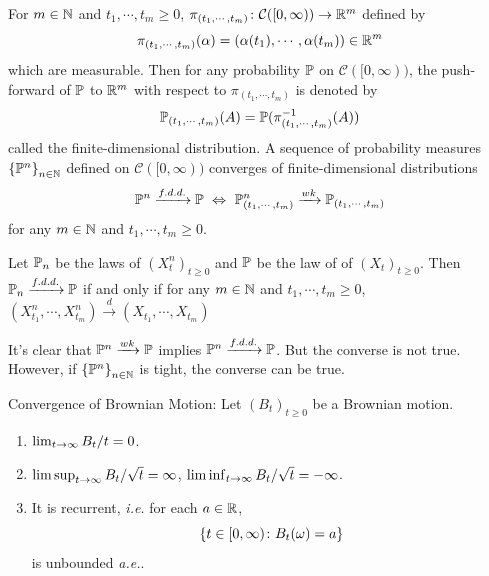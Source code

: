 \documentclass[a4paper,12pt]{article}
\begin{document}
\begin{itemize}
  \noindent For $m \in \mathbb{N}$ and $t_1,\cdots,t_m \geqslant 0$, $\pi_{(t_1,\cdots,t_m)} \colon \mathcal{C}([0,\infty)) \rightarrow \mathbb{R}^m$ defined by
  \begin{equation*}
    \pi_{(t_1,\cdots,t_m)}(\alpha) = (\alpha(t_1),\cdots,\alpha(t_m)) \in \mathbb{R}^m
  \end{equation*}
  which are measurable. Then for any probability $\mathbb{P}$ on $\mathcal{C}([0,\infty))$, the push-forward of $\mathbb{P}$ to $\mathbb{R}^m$ with respect to $\pi_{(t_1,\cdots,t_m)}$ is denoted by
  \begin{equation*}
    \mathbb{P}_{(t_1,\cdots,t_m)}(A) = \mathbb{P}(\pi_{(t_1,\cdots,t_m)}^{-1}(A))
  \end{equation*}
  called the finite-dimensional distribution. A sequence of probability measures $\left\{\mathbb{P}^n\right\}_{n \in \mathbb{N}}$ defined on $\mathcal{C}([0,\infty))$ converges of finite-dimensional distributions
  \begin{equation*}
    \mathbb{P}^n \xrightarrow{f.d.d.} \mathbb{P}~\Leftrightarrow~ \mathbb{P}^n_{(t_1,\cdots,t_m)} \xrightarrow{wk} \mathbb{P}_{(t_1,\cdots,t_m)}
  \end{equation*}
  for any $m \in \mathbb{N}$ and $t_1,\cdots,t_m \geqslant 0$.
  \begin{rmk}
    Let $\mathbb{P}_n$ be the laws of $(X^n_t)_{t \geqslant 0}$ and $\mathbb{P}$ be the law of of $(X_t)_{t \geqslant 0}$. Then $\mathbb{P}_n \xrightarrow{f.d.d.} \mathbb{P}$ if and only if for any $m \in \mathbb{N}$ and $t_1,\cdots,t_m \geqslant 0$, $(X^n_{t_1},\cdots,X^n_{t_m}) \xrightarrow{d} (X_{t_1},\cdots,X_{t_m})$
  \end{rmk}
  It's clear that $\mathbb{P}^n \xrightarrow{wk} \mathbb{P}$ implies $\mathbb{P}^n \xrightarrow{f.d.d.} \mathbb{P}$. But the converse is not true. However, if $\left\{\mathbb{P}^n\right\}_{n \in \mathbb{N}}$ is tight, the converse can be true.

  \noindent Convergence of Brownian Motion: Let $(B_t)_{t \geqslant 0}$ be a Brownian motion. 
  \begin{enumerate}[label=(\arabic*)]
    \item $\lim_{t \rightarrow \infty} B_t / t = 0$.
    \item $\limsup_{t \rightarrow \infty} B_t / \sqrt{t} = \infty$, $\liminf_{t \rightarrow \infty} B_t / \sqrt{t} = -\infty$.
    \item It is recurrent, \emph{i.e.} for each $a \in \mathbb{R}$,
    \begin{equation*}
      \left\{t \in [0,\infty) \colon B_t(\omega) = a\right\}
    \end{equation*}
    is unbounded \emph{a.e.}.
  \end{enumerate}


\end{itemize}
\end{document}
